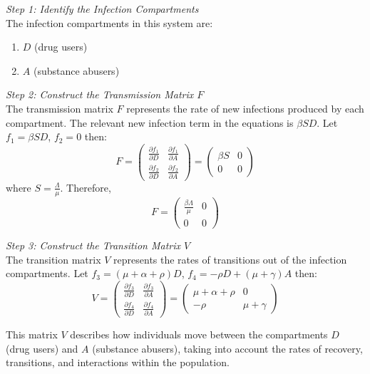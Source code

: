 \documentclass[12pt]{report}
\begin{document}
\textit{Step 1: Identify the Infection Compartments}
\\The infection compartments in this system are:
\begin{enumerate}
	\item \( D \) (drug users)
	\item \( A \) (substance abusers)
\end{enumerate}

\textit{Step 2: Construct the Transmission Matrix \( F \)}
\\The transmission matrix \( F \) represents the rate of new infections produced by each compartment. The relevant new infection term in the equations is \( \beta SD \). Let \( f_1 = \beta SD \), \( f_2 = 0 \) then:
\[ 
F = \begin{pmatrix}
	\frac{\partial f_1}{\partial D} & \frac{\partial f_1}{\partial A} \\
	\frac{\partial f_2}{\partial D} & \frac{\partial f_2}{\partial A}
\end{pmatrix}
= \begin{pmatrix}
	\beta S & 0 \\
	0 & 0
\end{pmatrix}
\]
where \( S = \frac{\Lambda}{\mu} \). Therefore,
\[ 
F = \begin{pmatrix}
	\frac{\beta \Lambda}{\mu} & 0 \\
	0 & 0
\end{pmatrix}
\]

\textit{Step 3: Construct the Transition Matrix \( V \)}
\\The transition matrix \( V \) represents the rates of transitions out of the infection compartments. Let \( f_3 = (\mu + \alpha + \rho)D \), \( f_4 = -\rho D + (\mu + \gamma)A \) then:
\[ 
V = \begin{pmatrix}
	\frac{\partial f_3}{\partial D} & \frac{\partial f_3}{\partial A} \\
	\frac{\partial f_4}{\partial D} & \frac{\partial f_4}{\partial A}
\end{pmatrix}
= \begin{pmatrix}
	\mu + \alpha + \rho & 0 \\
	-\rho  & \mu + \gamma
\end{pmatrix}
\]

This matrix \( V \) describes how individuals move between the compartments \( D \) (drug users) and \( A \) (substance abusers), taking into account the rates of recovery, transitions, and interactions within the population.\\
\end{document}
